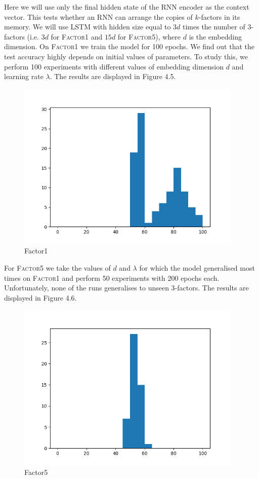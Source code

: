 \documentclass[titlepage]{report}
\begin{document}
Here we will use only the final hidden state of the RNN encoder as the context vector. This tests whether an RNN can arrange the copies of $k$-factors in its memory. We will use LSTM with hidden size equal to $3d$ times the number of 3-factors (i.e. $3d$ for \textsc{Factor1} and $15d$ for \textsc{Factor5}), where $d$ is the embedding dimension. On \textsc{Factor1} we train the model for 100 epochs. We find out that the test accuracy highly depends on initial values of parameters. To study this, we perform 100 experiments with different values of embedding dimension $d$ and learning rate $\lambda$. The results are displayed in Figure 4.5.

\begin{figure}[H]
\centering
\includegraphics[width = 108mm]{figures/histograms/factor1/auto/10-01}
\caption{Factor1}
\end{figure}

\noindent
For \textsc{Factor5} we take the values of $d$ and $\lambda$ for which the model generalised most times on \textsc{Factor1} and perform 50 experiments with 200 epochs each. Unfortunately, none of the runs generalises to unseen 3-factors. The results are displayed in Figure 4.6.

\begin{figure}[H]
\centering
\includegraphics[width = 108mm]{figures/histograms/factor5/auto/10-01}
\caption{Factor5}
\end{figure}
\end{document}

